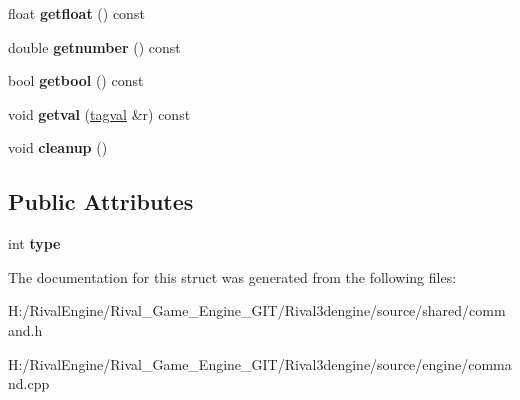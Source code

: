 \begin{DoxyCompactItemize}
\item 
\mbox{\label{structtagval_aac259fcbd52039f77e8831ce003abaea}} 
float {\bfseries getfloat} () const
\item 
\mbox{\label{structtagval_a291b36fe8f11c75b6f84f58fb82a7333}} 
double {\bfseries getnumber} () const
\item 
\mbox{\label{structtagval_a1eaba67323f3d7eb5281e8450bc99866}} 
bool {\bfseries getbool} () const
\item 
\mbox{\label{structtagval_a0685b9f6b1b756570c3c25a5578f5b99}} 
void {\bfseries getval} (\hyperlink{structtagval}{tagval} \&r) const
\item 
\mbox{\label{structtagval_a59203e6afaa1c6a198179ae9af3ba8a1}} 
void {\bfseries cleanup} ()
\end{DoxyCompactItemize}
\subsection*{Public Attributes}
\begin{DoxyCompactItemize}
\item 
\mbox{\label{structtagval_a864a1c40b2fb9514cec119327c7655ea}} 
int {\bfseries type}
\end{DoxyCompactItemize}


The documentation for this struct was generated from the following files\+:\begin{DoxyCompactItemize}
\item 
H\+:/\+Rival\+Engine/\+Rival\+\_\+\+Game\+\_\+\+Engine\+\_\+\+G\+I\+T/\+Rival3dengine/source/shared/command.\+h\item 
H\+:/\+Rival\+Engine/\+Rival\+\_\+\+Game\+\_\+\+Engine\+\_\+\+G\+I\+T/\+Rival3dengine/source/engine/command.\+cpp\end{DoxyCompactItemize}
